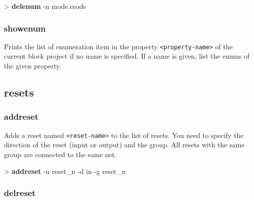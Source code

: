 \documentclass[10pt,a4paper]{article}
\begin{document}
\begin{sampletitle}
> \textbf{\tool{} delenum} -n mode.erode
\end{sampletitle}


\subsubsection{showenum}
\label{subsec:showenum}

Prints the list of enumeration item in the property \texttt{<property-name>} of the current block project if no name is specified. If a name is given, list the enums of the given property.

\subsection{resets}
\subsubsection{addreset}
\label{subsec:addreset}

Adds a reset named \texttt{<reset-name>} to the list of resets. You need to specify the direction of the reset (input or output) and the group. All resets with the same group are connected to the same net.\\


\begin{sampletitle}
> \textbf{\tool{} addreset} -n reset\_n -d in -g reset\_n
\end{sampletitle}


\subsubsection{delreset}
\label{subsec:delreset}
\end{document}

